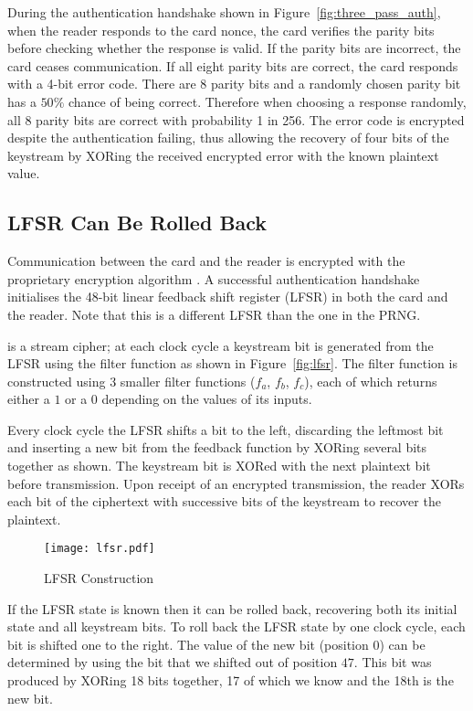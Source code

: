 \documentclass[dissertation.tex]{subfiles}
\begin{document}
  During the authentication handshake shown in Figure~\vref{fig:three_pass_auth}, when the reader responds to the card nonce, the card verifies the parity bits before checking whether the response is valid. If the parity bits are incorrect, the card ceases communication. If all eight parity bits are correct, the card responds with a 4-bit error code. There are 8 parity bits and a randomly chosen parity bit has a $50\%$ chance of being correct. Therefore when choosing a response randomly, all 8 parity bits are correct with probability 1 in 256. The error code is encrypted despite the authentication failing, thus allowing the recovery of four bits of the keystream by XORing the received encrypted error with the known plaintext value.

  \subsection{LFSR Can Be Rolled Back}
  Communication between the card and the reader is encrypted with the proprietary encryption algorithm \crypto{}. A successful authentication handshake initialises the 48-bit \crypto{} linear feedback shift register (LFSR) in both the card and the reader. Note that this is a different LFSR than the one in the PRNG.\@

  \crypto{} is a stream cipher; at each clock cycle a keystream bit is generated from the LFSR using the filter function as shown in Figure~\vref{fig:lfsr}. The filter function is constructed using 3 smaller filter functions ($f_a$, $f_b$, $f_c$), each of which returns either a $1$ or a $0$ depending on the values of its inputs.

  Every clock cycle the LFSR shifts a bit to the left, discarding the leftmost bit and inserting a new bit from the feedback function by XORing several bits together as shown. The keystream bit is XORed with the next plaintext bit before transmission. Upon receipt of an encrypted transmission, the reader XORs each bit of the ciphertext with successive bits of the keystream to recover the plaintext.

  \begin{figure}[h]
    \centering
    \texttt{[image: lfsr.pdf]}
    \caption{\crypto{} LFSR Construction}\label{fig:lfsr}
  \end{figure}

  If the LFSR state is known then it can be rolled back, recovering both its initial state and all keystream bits. To roll back the LFSR state by one clock cycle, each bit is shifted one to the right. The value of the new bit (position $0$) can be determined by using the bit that we shifted out of position $47$. This bit was produced by XORing 18 bits together, 17 of which we know and the 18th is the new bit.
\end{document}
